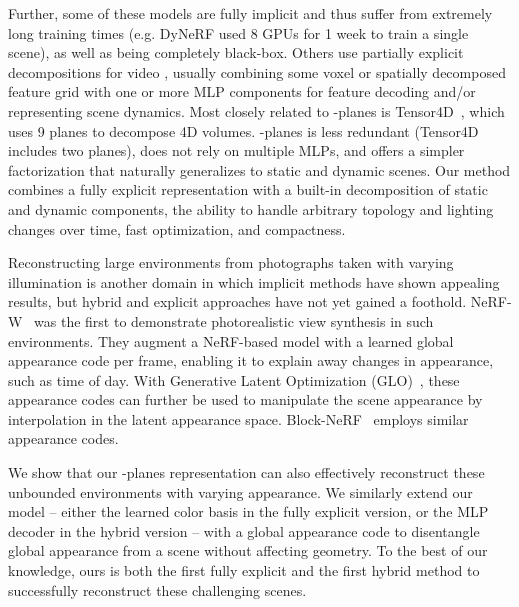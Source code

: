 \documentclass[10pt,twocolumn,letterpaper]{article}
\makeatletter
\newcommand{\modelname}{-planes}
\newcommand{\Modelname}{-planes}
\renewcommand{\paragraph}{\@startsection{paragraph}{4}{\z@}{0.65ex \@plus 1ex \@minus .2ex}{-1em}{\normalfont \normalsize \bfseries }}
\makeatother
\begin{document}
Further, some of these models are fully implicit \cite{dnerf, dynerf} and thus suffer from extremely long training times (e.g. DyNeRF used 8 GPUs for 1 week to train a single scene), as well as being completely black-box. Others use partially explicit decompositions for video \cite{tineuvox, nvgd, mixvoxels, v4d, tensor4d, devrf, neuralvolumes, nerfplayer}, usually combining some voxel or spatially decomposed feature grid with one or more MLP components for feature decoding and/or representing scene dynamics. Most closely related to \modelname{} is Tensor4D~\cite{tensor4d}, which uses 9 planes to decompose 4D volumes. \Modelname{} is less redundant (\eg Tensor4D includes two  planes), does not rely on multiple MLPs, and offers a simpler factorization that naturally generalizes to static and dynamic scenes.
Our method combines a fully explicit representation with a built-in decomposition of static and dynamic components, the ability to handle arbitrary topology and lighting changes over time, fast optimization, and compactness.





\paragraph{Appearance embedding.}
Reconstructing large environments from photographs taken with varying illumination is another domain in which implicit methods have shown appealing results, but hybrid and explicit approaches have not yet gained a foothold. NeRF-W~\cite{martinbrualla2020nerfw} was the first to demonstrate photorealistic view synthesis in such environments. They augment a NeRF-based model with a learned global appearance code per frame, enabling it to explain away changes in appearance, such as time of day. With Generative Latent Optimization (GLO)~\cite{Piotr2017latentspaceoptim}, these appearance codes can further be used to manipulate the scene appearance by interpolation in the latent appearance space. Block-NeRF~\cite{blocknerf2022tancik} employs similar appearance codes.


We show that our \modelname{} representation can also effectively reconstruct these unbounded environments with varying appearance.
We similarly extend our model -- either the learned color basis in the fully explicit version, or the MLP decoder in the hybrid version -- with a global appearance code to disentangle global appearance from a scene without affecting geometry. To the best of our knowledge, ours is both the first fully explicit and the first hybrid method to successfully reconstruct these challenging scenes.
\end{document}
